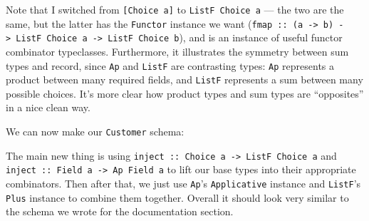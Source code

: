 \documentclass[]{article}
\newenvironment{Shaded}{}{}
\newcommand{\CommentTok}[1]{\textcolor[rgb]{0.38,0.63,0.69}{\textit{#1}}}
\newcommand{\DataTypeTok}[1]{\textcolor[rgb]{0.56,0.13,0.00}{#1}}
\newcommand{\NormalTok}[1]{#1}
\newcommand{\OperatorTok}[1]{\textcolor[rgb]{0.40,0.40,0.40}{#1}}
\newcommand{\OtherTok}[1]{\textcolor[rgb]{0.00,0.44,0.13}{#1}}
\newcommand{\StringTok}[1]{\textcolor[rgb]{0.25,0.44,0.63}{#1}}
\begin{document}
Note that I switched from \texttt{{[}Choice\ a{]}} to \texttt{ListF\ Choice\ a}
--- the two are the same, but the latter has the \texttt{Functor} instance we
want
(\texttt{fmap\ ::\ (a\ -\textgreater{}\ b)\ -\textgreater{}\ ListF\ Choice\ a\ -\textgreater{}\ ListF\ Choice\ b}),
and is an instance of useful functor combinator typeclasses. Furthermore, it
illustrates the symmetry between sum types and record, since \texttt{Ap} and
\texttt{ListF} are contrasting types: \texttt{Ap} represents a product between
many required fields, and \texttt{ListF} represents a sum between many possible
choices. It's more clear how product types and sum types are ``opposites'' in a
nice clean way.

We can now make our \texttt{Customer} schema:

\begin{Shaded}
\end{Shaded}

The main new thing is using
\texttt{inject\ ::\ Choice\ a\ -\textgreater{}\ ListF\ Choice\ a} and
\texttt{inject\ ::\ Field\ a\ -\textgreater{}\ Ap\ Field\ a} to lift our base
types into their appropriate combinators. Then after that, we just use
\texttt{Ap}'s \texttt{Applicative} instance and \texttt{ListF}'s \texttt{Plus}
instance to combine them together. Overall it should look very similar to the
schema we wrote for the documentation section.
\end{document}
